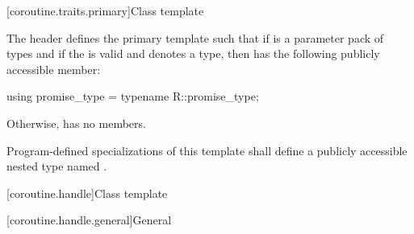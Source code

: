 [coroutine.traits.primary]{Class template }

\pnum
The header  defines the primary template
 such that
if  is a parameter pack of types and
if the   is valid and
denotes a type,
then  has the following publicly
accessible member:
\begin{codeblock}
using promise_type = typename R::promise_type;
\end{codeblock}

Otherwise,  has no members.

\pnum
Program-defined specializations of this template shall define a publicly
accessible nested type named .

[coroutine.handle]{Class template }

[coroutine.handle.general]{General}

